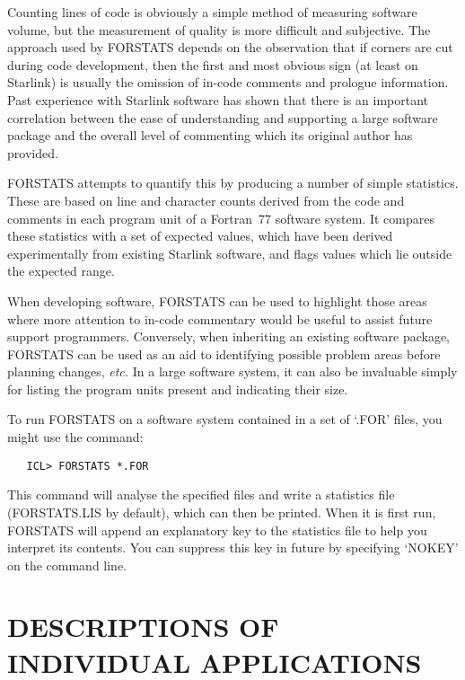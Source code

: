 Counting lines of code is obviously a simple method of measuring software
volume, but the measurement of quality is more difficult and subjective. 
The approach used by FORSTATS depends on the observation that if corners are
cut during code development, then the first and most obvious sign (at least 
on Starlink) is usually the omission of in-code comments and prologue
information. 
Past experience with Starlink software has shown that there is an important
correlation between the ease of understanding and supporting a large
software package and the overall level of commenting which its original
author has provided. 

FORSTATS attempts to quantify this by producing a number of simple
statistics.
These are based on line and character counts derived from the code and
comments in each program unit of a Fortran~77 software system. 
It compares these statistics with a set of expected values, which have been
derived experimentally from existing Starlink software, and flags values
which lie outside the expected range. 

When developing software, FORSTATS can be used to highlight those areas
where more attention to in-code commentary would be useful to assist future
support programmers. 
Conversely, when inheriting an existing software package, FORSTATS can be
used as an aid to identifying possible problem areas before planning 
changes, {\em etc.}
In a large software system, it can also be invaluable simply for listing the
program units present and indicating their size. 

To run FORSTATS on a software system contained in a set of `.FOR' files, you
might use the command: 

\begin{verbatim}
   ICL> FORSTATS *.FOR
\end{verbatim}

This command will analyse the specified files and write a statistics file
(FORSTATS.LIS by default), which can then be printed. 
When it is first run, FORSTATS will append an explanatory key to the
statistics file to help you interpret its contents. 
You can suppress this key in future by specifying `NOKEY' on the command
line. 

\newpage
\appendix
\section{DESCRIPTIONS OF INDIVIDUAL APPLICATIONS}
\label{appendix:descriptions}

